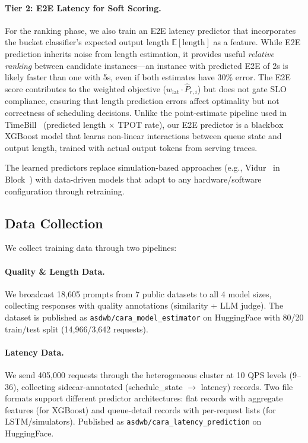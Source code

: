 \documentclass[letterpaper, anonymous, twocolumn, 10pt]{article}
\begin{document}
\paragraph{Tier 2: E2E Latency for Soft Scoring.}
For the ranking phase, we also train an E2E latency predictor that incorporates the bucket classifier's expected output length $\mathbb{E}[\text{length}]$ as a feature.
While E2E prediction inherits noise from length estimation, it provides useful \emph{relative ranking} between candidate instances---an instance with predicted E2E of 2s is likely faster than one with 5s, even if both estimates have 30\% error.
The E2E score contributes to the weighted objective ($w_{\text{lat}} \cdot \hat{P}_{r,i}$) but does not gate SLO compliance, ensuring that length prediction errors affect optimality but not correctness of scheduling decisions.
Unlike the point-estimate pipeline used in TimeBill~\cite{timebill2025} (predicted length $\times$ TPOT rate), our E2E predictor is a blackbox XGBoost model that learns non-linear interactions between queue state and output length, trained with actual output tokens from serving traces.

The learned predictors replace simulation-based approaches (e.g., Vidur~\cite{Agrawal2024VidurAL} in Block~\cite{da2025blockbalancingloadllm}) with data-driven models that adapt to any hardware/software configuration through retraining.

\subsection{Data Collection}

We collect training data through two pipelines:

\paragraph{Quality \& Length Data.}
We broadcast 18,605 prompts from 7 public datasets to all 4 model sizes, collecting responses with quality annotations (similarity + LLM judge). The dataset is published as \texttt{asdwb/cara\_model\_estimator} on HuggingFace with 80/20 train/test split (14,966/3,642 requests).

\paragraph{Latency Data.}
We send 405,000 requests through the heterogeneous cluster at 10 QPS levels (9--36), collecting sidecar-annotated (schedule\_state $\rightarrow$ latency) records. Two file formats support different predictor architectures: flat records with aggregate features (for XGBoost) and queue-detail records with per-request lists (for LSTM/simulators). Published as \texttt{asdwb/cara\_latency\_prediction} on HuggingFace.
\end{document}
